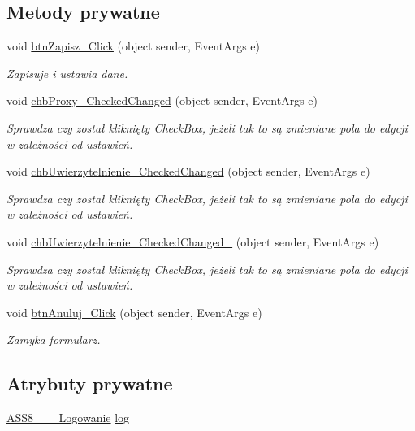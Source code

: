 \subsection*{Metody prywatne}
\begin{CompactItemize}
\item 
void \hyperlink{a00004_7e564cde1dca7d07ae2e0fd2ed7de14f}{btnZapisz\_\-Click} (object sender, EventArgs e)
\begin{CompactList}\small\item\em Zapisuje i ustawia dane. \item\end{CompactList}\item 
void \hyperlink{a00004_783009da735c7b89fe61f2dd123af5b4}{chbProxy\_\-CheckedChanged} (object sender, EventArgs e)
\begin{CompactList}\small\item\em Sprawdza czy został kliknięty CheckBox, jeżeli tak to są zmieniane pola do edycji w zależności od ustawień. \item\end{CompactList}\item 
void \hyperlink{a00004_c4c4b631a751d956ebda200dfd7ad1bc}{chbUwierzytelnienie\_\-CheckedChanged} (object sender, EventArgs e)
\begin{CompactList}\small\item\em Sprawdza czy został kliknięty CheckBox, jeżeli tak to są zmieniane pola do edycji w zależności od ustawień. \item\end{CompactList}\item 
void \hyperlink{a00004_74d326c91a9c46b770f8cf028efb3507}{chbUwierzytelnienie\_\-CheckedChanged\_} (object sender, EventArgs e)
\begin{CompactList}\small\item\em Sprawdza czy został kliknięty CheckBox, jeżeli tak to są zmieniane pola do edycji w zależności od ustawień. \item\end{CompactList}\item 
void \hyperlink{a00004_c05c96bb15c5fcffef1fa55f7078750e}{btnAnuluj\_\-Click} (object sender, EventArgs e)
\begin{CompactList}\small\item\em Zamyka formularz. \item\end{CompactList}\end{CompactItemize}
\subsection*{Atrybuty prywatne}
\begin{CompactItemize}
\item 
\hyperlink{a00001}{ASS8\_\-\_\-\_\-Logowanie} \hyperlink{a00004_e630ae8595038e00daa6a1f42b134b59}{log}
\end{CompactItemize}


